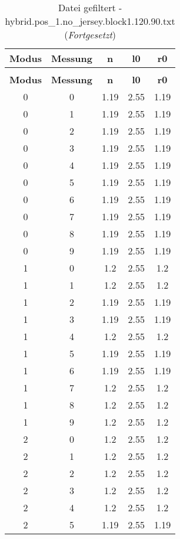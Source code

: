 \begin{longtable}{|c|c||c||c||c|}
	\caption{Datei gefiltert - hybrid.pos\_1.no\_jersey.block1.120.90.txt} \label{tab:hybrid.pos-1.no-jersey.block1.120.90.txt} \\ \hline
	\textbf{Modus} & \textbf{Messung} & \textbf{n} & \textbf{l0} & \textbf{r0}\\ \hline
	\endfirsthead
	\caption[]{Datei gefiltert - hybrid.pos\_1.no\_jersey.block1.120.90.txt (\emph{Fortgesetzt})} \\ \hline
	\textbf{Modus} & \textbf{Messung} & \textbf{n} & \textbf{l0} & \textbf{r0}\\ \hline
	\endhead
	0 & 0 & 1.19 & 2.55 & 1.19 \\ \hline
	0 & 1 & 1.19 & 2.55 & 1.19 \\ \hline
	0 & 2 & 1.19 & 2.55 & 1.19 \\ \hline
	0 & 3 & 1.19 & 2.55 & 1.19 \\ \hline
	0 & 4 & 1.19 & 2.55 & 1.19 \\ \hline
	0 & 5 & 1.19 & 2.55 & 1.19 \\ \hline
	0 & 6 & 1.19 & 2.55 & 1.19 \\ \hline
	0 & 7 & 1.19 & 2.55 & 1.19 \\ \hline
	0 & 8 & 1.19 & 2.55 & 1.19 \\ \hline
	0 & 9 & 1.19 & 2.55 & 1.19 \\ \hline
	1 & 0 & 1.2 & 2.55 & 1.2 \\ \hline
	1 & 1 & 1.2 & 2.55 & 1.2 \\ \hline
	1 & 2 & 1.19 & 2.55 & 1.19 \\ \hline
	1 & 3 & 1.19 & 2.55 & 1.19 \\ \hline
	1 & 4 & 1.2 & 2.55 & 1.2 \\ \hline
	1 & 5 & 1.19 & 2.55 & 1.19 \\ \hline
	1 & 6 & 1.19 & 2.55 & 1.19 \\ \hline
	1 & 7 & 1.2 & 2.55 & 1.2 \\ \hline
	1 & 8 & 1.2 & 2.55 & 1.2 \\ \hline
	1 & 9 & 1.2 & 2.55 & 1.2 \\ \hline
	2 & 0 & 1.2 & 2.55 & 1.2 \\ \hline
	2 & 1 & 1.2 & 2.55 & 1.2 \\ \hline
	2 & 2 & 1.2 & 2.55 & 1.2 \\ \hline
	2 & 3 & 1.2 & 2.55 & 1.2 \\ \hline
	2 & 4 & 1.2 & 2.55 & 1.2 \\ \hline
	2 & 5 & 1.19 & 2.55 & 1.19 \\ \hline

\end{longtable}
